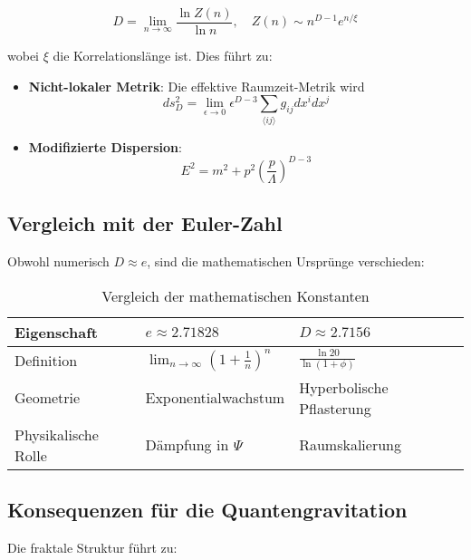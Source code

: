 \begin{equation}
D = \lim_{n\to\infty} \frac{\ln Z(n)}{\ln n}, \quad Z(n) \sim n^{D-1}e^{n/\xi}
\end{equation}

wobei $\xi$ die Korrelationslänge ist. Dies führt zu:

\begin{itemize}
\item \textbf{Nicht-lokaler Metrik}: Die effektive Raumzeit-Metrik wird
\begin{equation}
ds^2_D = \lim_{\epsilon\to 0} \epsilon^{D-3} \sum_{\langle ij\rangle} g_{ij} dx^i dx^j
\end{equation}

\item \textbf{Modifizierte Dispersion}:
\begin{equation}
E^2 = m^2 + p^2 \left(\frac{p}{\Lambda}\right)^{D-3}
\end{equation}
\end{itemize}

\subsection{Vergleich mit der Euler-Zahl}
\label{subsec:euler_comparison}

Obwohl numerisch $D \approx e$, sind die mathematischen Ursprünge verschieden:

\begin{table}[h]
\centering
\caption{Vergleich der mathematischen Konstanten}
\begin{tabular}{lll}
\toprule
Eigenschaft & $e \approx 2.71828$ & $D \approx 2.7156$ \\
\midrule
Definition & $\lim_{n\to\infty}(1+\frac{1}{n})^n$ & $\frac{\ln 20}{\ln(1+\phi)}$ \\
Geometrie & Exponentialwachstum & Hyperbolische Pflasterung \\
Physikalische Rolle & Dämpfung in $\Psi$ & Raumskalierung \\
\bottomrule
\end{tabular}
\end{table}

\subsection{Konsequenzen für die Quantengravitation}
\label{subsec:quantum_gravity}

Die fraktale Struktur führt zu:

